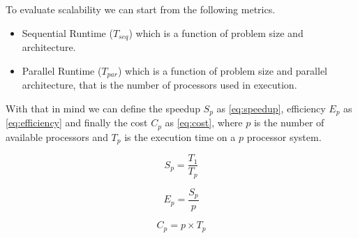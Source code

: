 To evaluate scalability we can start from the following metrics.

\begin{itemize}
    \item Sequential Runtime ($T_{seq}$) which is a function of problem size and architecture.
    \item Parallel Runtime ($T_{par}$) which is a function of problem size and parallel architecture, that is the number of processors used in execution.
\end{itemize}

With that in mind we can define the speedup $S_p$ as \autoref{eq:speedup},
efficiency $E_p$ as \autoref{eq:efficiency}
and finally the cost $C_p$ as \autoref{eq:cost},
where $p$ is the number of available processors and $T_p$ is the execution time on a $p$ processor system.

\begin{equation}\label{eq:speedup}
    S_p = \frac{T_1}{T_p}
\end{equation}

\begin{equation}\label{eq:efficiency}
    E_p = \frac{S_p}{p}
\end{equation}

\begin{equation}\label{eq:cost}
    C_p = p \times T_p
\end{equation}